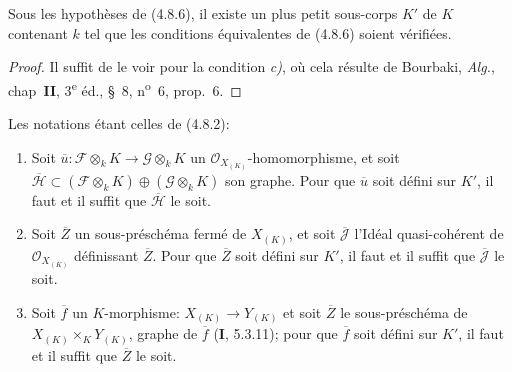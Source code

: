 \begin{corollary}[4.8.7]
\label{IV.2.4.8.7-fr}
Sous les hypothèses de \textup{(4.8.6)}, il existe un plus petit sous-corps $K'$ de $K$
contenant $k$ tel que les conditions équivalentes de \textup{(4.8.6)} soient vérifiées.
\end{corollary}

\begin{proof}
Il suffit de le voir pour la condition \emph{c)}, où cela résulte de Bourbaki,
\emph{Alg.}, chap~\textbf{II}, 3\textsuperscript{e} éd., \S~8,
n\textsuperscript{o}~6, prop.~6.
\end{proof}

\begin{lemma}[4.8.8]
\label{IV.2.4.8.8-fr}
Les notations étant celles de \textup{(4.8.2)}:
\begin{enumerate}
\item[\textup{(i)}] Soit
$\overline u:\mathscr F\otimes_kK\to\mathscr G\otimes_kK$ un
$\mathcal O_{X_{(K)}}$-homomorphisme, et soit
$\overline{\mathscr H}\subset
(\mathscr F\otimes_kK)\oplus(\mathscr G\otimes_kK)$ son graphe. Pour que
$\overline u$ soit défini sur $K'$, il faut et il suffit que
$\overline{\mathscr H}$ le soit.
\item[\textup{(ii)}] Soit $\overline Z$ un sous-préschéma fermé de $X_{(K)}$, et soit
$\overline{\mathscr J}$ l'Idéal quasi-cohérent de $\mathcal O_{X_{(K)}}$
définissant $\overline Z$. Pour que $\overline Z$ soit défini sur $K'$, il
faut et il suffit que $\overline{\mathscr J}$ le soit.
\item[\textup{(iii)}] Soit $\overline f$ un $K$-morphisme:
$X_{(K)}\to Y_{(K)}$ et soit $\overline Z$ le sous-préschéma de
$X_{(K)}\times_KY_{(K)}$, graphe de $\overline f$ \textup{(\textbf{I}, 5.3.11)}; pour que
$\overline f$ soit défini sur $K'$, il faut et il suffit que $\overline Z$ le
soit.
\end{enumerate}
\end{lemma}

